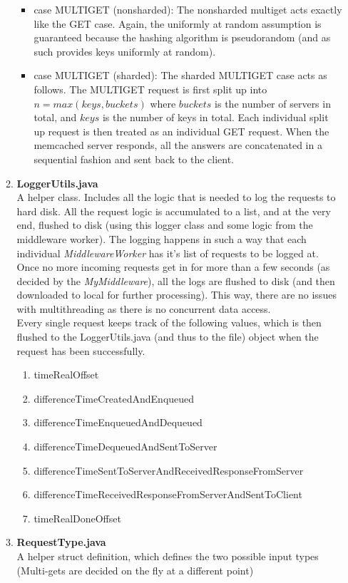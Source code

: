 \documentclass[11pt,a4paper]{article}
\begin{document}
\begin{enumerate}
\begin{enumerate}
\begin{itemize}
\item case MULTIGET (nonsharded):
The nonsharded multiget acts exactly like the GET case.
Again, the uniformly at random assumption is guaranteed because the hashing algorithm is pseudorandom (and as such provides keys uniformly at random).

\item case MULTIGET (sharded):
The sharded MULTIGET case acts as follows. The MULTIGET request is first split up into $n = max(keys, buckets)$ where $buckets$ is the number of servers in total, and $keys$ is the number of keys in total.
Each individual split up request is then treated as an individual GET request.
When the memcached server responds, all the answers are concatenated in a sequential fashion and sent back to the client.
\end{itemize}


\item \textbf{LoggerUtils.java} \\
A helper class.
Includes all the logic that is needed to log the requests to hard disk.
All the request logic is accumulated to a list, and at the very end, flushed to disk (using this logger class and some logic from the middleware worker).
The logging happens in such a way that each individual \textit{MiddlewareWorker} has it's list of requests to be logged at.
Once no more incoming requests get in for more than a few seconds (as decided by the \textit{MyMiddleware}), all the logs are flushed to disk (and then downloaded to local for further processing).
This way, there are no issues with multithreading as there is no concurrent data access. \\

Every single request keeps track of the following values, 
which is then flushed to the LoggerUtils.java (and thus to the file)
object when the request has been successfully.

\begin{enumerate}
\item timeRealOffset
\item differenceTimeCreatedAndEnqueued
\item differenceTimeEnqueuedAndDequeued
\item differenceTimeDequeuedAndSentToServer
\item differenceTimeSentToServerAndReceivedResponseFromServer
\item differenceTimeReceivedResponseFromServerAndSentToClient
\item timeRealDoneOffset
\end{enumerate}

\item \textbf{RequestType.java} \\
A helper struct definition, which defines the two possible input types (Multi-gets are decided on the fly at a different point)

\end{enumerate}

\end{enumerate}
\end{document}
